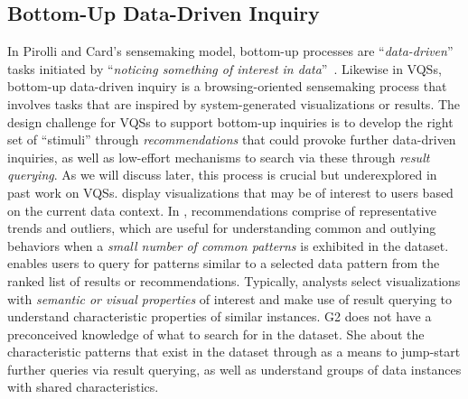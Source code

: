    \subsection{Bottom-Up Data-Driven Inquiry}%
   In Pirolli and Card's sensemaking model, bottom-up processes are ``\textit{data-driven}'' tasks initiated by ``\textit{noticing something of interest in data}''~\cite{Pirolli}. Likewise in VQSs, bottom-up data-driven inquiry is a browsing-oriented sensemaking process that involves tasks that are inspired by system-generated visualizations or results. The design challenge for VQSs to support bottom-up inquiries is to develop the right set of ``stimuli'' through \textit{recommendations} that could provoke further data-driven inquiries, as well as low-effort mechanisms to search via these  through \textit{result querying}. As we will discuss later, this process is crucial but underexplored in past work on VQSs. %
    display visualizations that may be of interest to users based on the current data context. In \zvpp, recommendations comprise of representative trends and outliers, which are useful for understanding common and outlying behaviors when a \emph{small number of common patterns} is exhibited in the dataset. %
    enables users to query for patterns similar to a selected data pattern from the ranked list of results or recommendations. Typically, analysts select visualizations with \emph{semantic or visual properties} of interest and make use of result querying to understand characteristic properties of similar instances.
    G2 does not have a preconceived knowledge of what to search for in the dataset. She  about the characteristic patterns that exist in the dataset through  as a means to jump-start further queries via result querying, as well as understand groups of data instances with shared characteristics.
